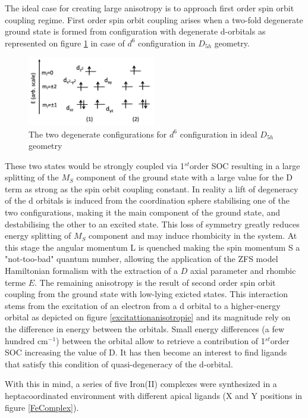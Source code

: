 \documentclass[10pt]{report}
\numberwithin{equation}{section}
\begin{document}
The ideal case for creating large anisotropy is to approach first order spin orbit coupling regime. 
First order spin orbit coupling arises when a two-fold degenerate ground state is formed from configuration with degenerate d-orbitals as represented on figure \ref{Fer_config} in case of $d^6$ configuration in $D_{5h}$ geometry.

\begin{figure}[h!]
    \centering
    \includegraphics[width=0.5\textwidth]{Images/DiagOrbFed6.png}
    \caption{The two degenerate configurations for $d^6$ configuration in ideal $D_{5h}$ geometry}
    \label{Fer_config}
\end{figure}

These two states would be strongly coupled via 1$^{st}$order SOC resulting in a large splitting of the $M_S$ component of the ground state with a large value for the D term as strong as the spin orbit coupling constant.
In reality a lift of degeneracy of the d orbitals is induced from the coordination sphere stabilising one of the two configurations, making it the main component of the ground state, and destabilising the other to an excited state.
This loss of symmetry greatly reduces energy splitting of $M_S$ component and may induce rhombicity in the system. 
At this stage the angular momentum L is quenched making the spin momentum S a "not-too-bad" quantum number, allowing the application of the ZFS model Hamiltonian formalism with the extraction of a $D$ axial parameter and rhombic terme $E$.
The remaining anisotropy is the result of second order spin orbit coupling from the ground state with low-lying exicted states.
This interaction stems from the excitation of an electron from a d orbital to a higher-energy orbital as depicted on figure \ref{excitattionanisotropie} and its magnitude rely on the difference in energy between the orbitals.
Small energy differences (a few hundred cm$^{-1}$) between the orbital allow to retrieve a contribution of 1$^{st}$order SOC increasing the value of D.
It has then become an interest to find ligands that satisfy this condition of quasi-degeneracy of the d-orbital.

With this in mind, a series of five Iron(II) complexes were synthesized in a heptacoordinated environment with different apical ligands (X and Y positions in figure \ref{FeComplex}).
\end{document}
